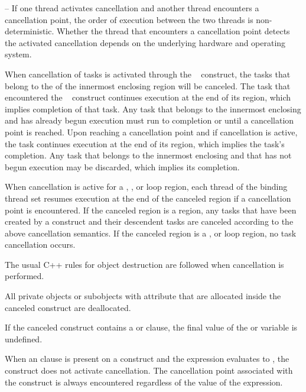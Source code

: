 \notestart
\noteheader – If one thread activates cancellation and another thread encounters a cancellation 
point, the order of execution between the two threads is non-deterministic. 
Whether the thread that encounters a cancellation point detects the activated cancellation 
depends on the underlying hardware and operating system.
\noteend

When cancellation of tasks is activated through the
~ construct, the tasks that belong to the
 of the innermost enclosing  region
will be canceled. The task that encountered the
~ construct continues execution at the
end of its  region, which implies completion of that
task. Any task that belongs to the innermost enclosing
 and has already begun execution must run to
completion or until a cancellation point is reached. Upon reaching a
cancellation point and if cancellation is active, the task continues
execution at the end of its  region, which implies the
task's completion. Any task that belongs to the innermost enclosing
 and that has not begun execution may be discarded,
which implies its completion.

When cancellation is active for a , , or loop region, each 
thread of the binding thread set resumes execution at the end of the canceled region if a 
cancellation point is encountered. If the canceled region is a  region, any 
tasks that have been created by a  construct and their descendent tasks are 
canceled according to the above  cancellation semantics. If the canceled 
region is a , or loop region, no task cancellation occurs.

\cppspecificstart
The usual C++ rules for object destruction are followed when cancellation is performed.
\cppspecificend

\fortranspecificstart
All private objects or subobjects with  attribute that are allocated inside 
the canceled construct are deallocated.
\fortranspecificend

If the canceled construct contains a  or  clause, the final 
value of the  or  variable is undefined.

When an  clause is present on a  construct and the  expression evaluates 
to , the  construct does not activate cancellation. The cancellation point 
associated with the  construct is always encountered regardless of the value of 
the  expression.

